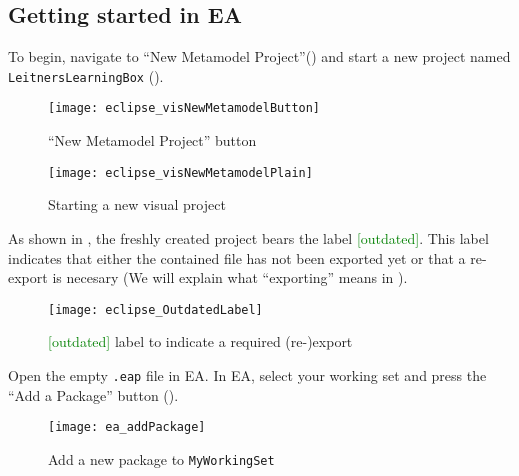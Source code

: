 \newpage
\hypertarget{static:starting vis}{}
\subsection{Getting started in EA}
\genHeader
  
\begin{stepbystep}

\item  To begin, navigate to ``New Metamodel Project''() and start a new project named \texttt{Leit\-ners\-Learn\-ing\-Box} (). 

\vspace{0.5cm}

\begin{figure}[htbp]
	\centering
  \texttt{[image: eclipse\_visNewMetamodelButton]}
	\caption{``New Metamodel Project'' button}
	\label{eclipse:newVisModelButton}
\end{figure}
\begin{figure}[htbp]
	\centering
  \texttt{[image: eclipse\_visNewMetamodelPlain]}
	\caption{Starting a new visual project}
	\label{eclipse:newVisModel}
\end{figure}

\vspace{0.5cm}

\item
As shown in , the freshly created project bears the label \textcolor{green}{[outdated]}.
This label indicates that either the contained  file has not been exported yet or that a re-export is necesary (We will explain what \enquote{exporting} means in ).
%
\begin{figure}[htbp]
    \centering
    \texttt{[image: eclipse\_OutdatedLabel]}
    \caption{\textcolor{green}{[outdated]} label to indicate a required (re-)export}
    \label{eclipse:OutdatedLabel}
\end{figure}

\vspace{0.5cm}

\item Open the empty \texttt{.eap} file in EA.
In EA, select your working set and press the ``Add a Package'' button (). 

\begin{figure}[htbp]
	\centering
  \texttt{[image: ea\_addPackage]}
	\caption{Add a new package to \texttt{MyWorkingSet}}
	\label{ea:newPackage}
	\vspace{0.5cm}
\end{figure}


\end{stepbystep}
